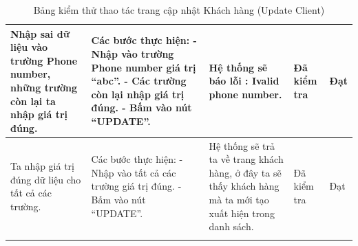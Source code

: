 \documentclass{article}
\begin{document}
\begin{longtable}{ | p{} |p{} | p{}  | p{}  | p{}  | }
\hline
Nhập sai dữ liệu vào trường Phone number, những trường còn lại ta nhập giá trị đúng. &
Các bước thực hiện: \newline
- Nhập vào trường Phone number giá trị  “abc”.  \newline
- Các trường còn lại nhập giá trị đúng. \newline
- Bấm vào nút “UPDATE”.
&
Hệ thống sẽ báo lỗi :  Ivalid phone number.
&
Đã kiểm tra &
Đạt \\

\hline
Ta nhập giá trị đúng dữ liệu cho tất cả các trường. &
Các bước thực hiện: \newline
- Nhập vào tất cả các trường giá trị đúng.  \newline
- Bấm vào nút “UPDATE”.
&
Hệ thống sẽ trả ta về trang khách hàng, ở đây ta sẽ thấy khách hàng mà ta mới tạo xuất hiện trong danh sách.
&
Đã kiểm tra &
Đạt \\

\hline
\caption{Bảng kiểm thử thao tác trang cập nhật Khách hàng (Update Client)}
\end{longtable}

\end{document}
